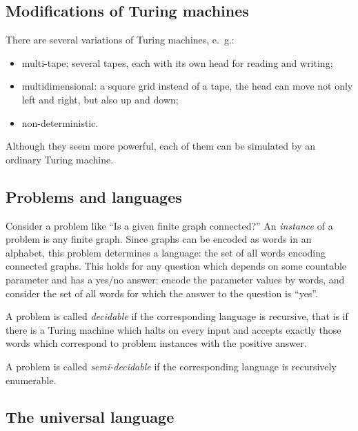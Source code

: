 \begin{page}

\subsection{Modifications of Turing machines}
There are several variations of Turing machines, e.~g.:
\begin{itemize}
\item
multi-tape: several tapes, each with its own head for reading and writing;
\item
multidimensional: a square grid instead of a tape, the head can move not only left and right, but also up and down;
\item
non-deterministic.
\end{itemize}
Although they seem more powerful, each of them can be simulated by an ordinary Turing machine.



\subsection{Problems and languages}
Consider a problem like ``Is a given finite graph connected?''
An \emph{instance} of a problem is any finite graph.
Since graphs can be encoded as words in an alphabet, this problem determines a language:
the set of all words encoding connected graphs.
This holds for any question which depends on some countable parameter and has a yes/no answer:
encode the parameter values by words, and consider the set of all words for which the answer to the question is ``yes''.


\end{page}

\begin{page}

\begin{dfn}
A problem is called \emph{decidable} if the corresponding language is recursive,
that is if there is a Turing machine which halts on every input
and accepts exactly those words which correspond to problem instances with the positive answer.

A problem is called \emph{semi-decidable} if the corresponding language is recursively enumerable.
\end{dfn}

\end{page}

\begin{page}

\subsection{The universal language}

\end{page}

